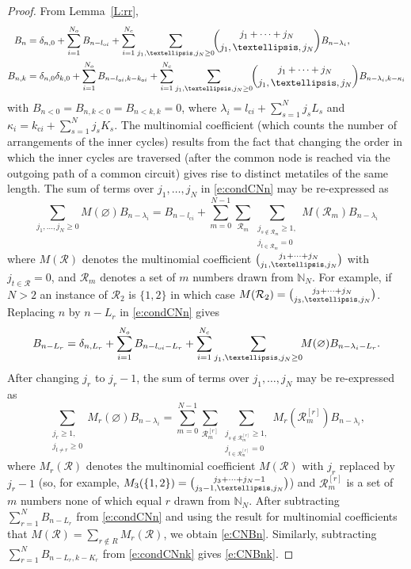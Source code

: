 \documentclass[10pt,a4paper]{amsart}
\newcommand{\rb}[1]{_{\rm #1}} %
\providecommand{\Nset}{\mathbb{N}}
\begin{document}
\begin{proof}
From Lemma~\ref{L:rr},
\begin{subequations}
\begin{align}\label{e:condCNn}
B_n&=\delta_{n,0}+\sum_{i=1}^{N\rb{o}}B_{n-l_{\mathrm{o}i}}+
\sum_{i=1}^{N\rb{c}}\sum_{j_1,\ldots,j_N\ge0}\!\!
\binom{j_1+\cdots+j_N}{j_1,\ldots,j_N}B_{n-\lambda_i},\\
\label{e:condCNnk}
B_{n,k}&=\delta_{n,0}\delta_{k,0}
+\sum_{i=1}^{N\rb{o}}B_{n-l_{\mathrm{o}i},k-k_{\mathrm{o}i}}+
\sum_{i=1}^{N\rb{c}}\sum_{j_1,\ldots,j_N\ge0}\!\!
\binom{j_1+\cdots+j_N}{j_1,\ldots,j_N}B_{n-\lambda_i,k-\kappa_i}
\end{align}
\end{subequations}
with $B_{n<0}=B_{n,k<0}=B_{n<k,k}=0$, 
where $\lambda_i=l_{\mathrm{c}i}+\sum_{s=1}^Nj_sL_s$ and 
$\kappa_i=k_{\mathrm{c}i}+\sum_{s=1}^Nj_sK_s$. 
The multinomial coefficient (which counts the number of
arrangements of the inner cycles) results from the fact that changing
the order in which the inner cycles are traversed (after the common
node is reached via the outgoing path of a common circuit) gives rise to
distinct metatiles of the same length.  The sum of terms over $j_1,\ldots,j_N$
in \eqref{e:condCNn} may be re-expressed as
\[
\sum_{j_1,\ldots,j_N\ge0}\!\!M(\varnothing)B_{n-\lambda_i}=
B_{n-l_{\mathrm{c}i}}+
\sum_{m=0}^{N-1}\sum_{\mathcal{R}_m}
\sum_{\substack{j_{s\notin\mathcal{R}_m}\geq1,\\j_{t\in\mathcal{R}_m}=0}}\!\!\!\!
M(\mathcal{R}_m)B_{n-\lambda_i}
\]
where $M(\mathcal{R})$ denotes the multinomial coefficient
$\tbinom{j_1+\cdots+j_N}{j_1,\ldots,j_N}$ with $j_{t\in\mathcal{R}}=0$,
and $\mathcal{R}_m$ denotes a set of $m$ numbers drawn from $\Nset_N$.  
For example, if $N>2$ an instance of $\mathcal{R}_2$ is $\{1,2\}$ in which case
$M(\mathcal{R}_2)=\tbinom{j_3+\cdots+j_N}{j_3,\ldots,j_N}$. 
Replacing $n$ by $n-L_r$ in
\eqref{e:condCNn} gives
\[
B_{n-L_r}=\delta_{n,L_r}+\sum_{i=1}^{N\rb{o}}B_{n-l_{\mathrm{o}i}-L_r}+
\sum_{i=1}^{N\rb{c}}\sum_{j_1,\ldots,j_N\ge0}\!\!
M(\varnothing)B_{n-\lambda_i-L_r}.
\]
After changing $j_r$ to $j_r-1$, 
the sum of terms over $j_1,\ldots,j_N$ may be re-expressed as
\[
\sum_{\substack{j_r\geq1,\\j_{t\neq r}\geq0}}\!\!\!\!
M_r(\varnothing)B_{n-\lambda_i}
=\sum_{m=0}^{N-1}\sum_{\mathcal{R}_m^{[r]}}
\sum_{\substack{j_{s\notin\mathcal{R}_m^{[r]}}\geq1,\\j_{t\in\mathcal{R}_m^{[r]}}=0}}\!\!\!\!
M_r(\mathcal{R}_m^{[r]})B_{n-\lambda_i},
\]
where $M_r(\mathcal{R})$ denotes the multinomial coefficient
$M(\mathcal{R})$ with $j_r$ replaced by $j_r-1$ (so, for example,
$M_3(\{1,2\})=\tbinom{j_3+\cdots+j_N-1}{j_3-1,\ldots,j_N}$) and
$\mathcal{R}_m^{[r]}$ is a set of $m$ numbers none of which equal $r$ 
drawn from $\Nset_N$.  After subtracting $\sum_{r=1}^N B_{n-L_r}$ from
\eqref{e:condCNn} and using the result for multinomial coefficients
that $M(\mathcal{R})=\sum_{r\notin R}M_r(\mathcal{R})$, we obtain
\eqref{e:CNBn}. Similarly, subtracting $\sum_{r=1}^N B_{n-L_r,k-K_r}$ from
\eqref{e:condCNnk} gives \eqref{e:CNBnk}.
\end{proof}
\end{document}
